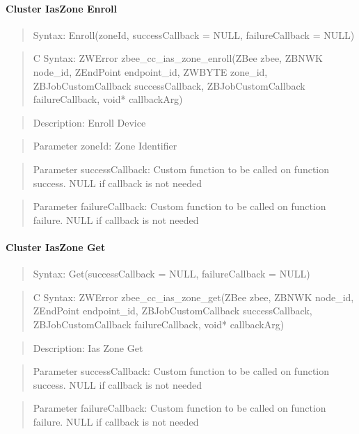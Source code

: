 \paragraph{Cluster IasZone Enroll}
\begin{quote}Syntax: Enroll(zoneId, successCallback = NULL, failureCallback = NULL)\end{quote}
\begin{quote}C Syntax: ZWError zbee\_cc\_ias\_zone\_enroll(ZBee zbee, ZBNWK node\_id, ZEndPoint endpoint\_id, ZWBYTE zone\_id, ZBJobCustomCallback successCallback, ZBJobCustomCallback failureCallback, void* callbackArg)\end{quote}
\begin{quote}Description: Enroll Device\end{quote}
\begin{quote}Parameter zoneId: Zone Identifier\end{quote}
\begin{quote}Parameter successCallback: Custom function to be called on function success. NULL if callback is not needed\end{quote}
\begin{quote}Parameter failureCallback: Custom function to be called on function failure. NULL if callback is not needed\end{quote}


\paragraph{Cluster IasZone Get}
\begin{quote}Syntax: Get(successCallback = NULL, failureCallback = NULL)\end{quote}
\begin{quote}C Syntax: ZWError zbee\_cc\_ias\_zone\_get(ZBee zbee, ZBNWK node\_id, ZEndPoint endpoint\_id, ZBJobCustomCallback successCallback, ZBJobCustomCallback failureCallback, void* callbackArg)\end{quote}
\begin{quote}Description: Ias Zone Get\end{quote}
\begin{quote}Parameter successCallback: Custom function to be called on function success. NULL if callback is not needed\end{quote}
\begin{quote}Parameter failureCallback: Custom function to be called on function failure. NULL if callback is not needed\end{quote}


